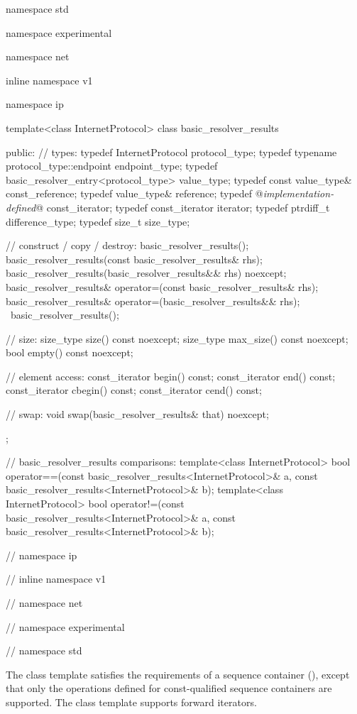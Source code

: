 \begin{codeblock}
namespace std {
namespace experimental {
namespace net {
inline namespace v1 {
namespace ip {

  template<class InternetProtocol>
  class basic_resolver_results
  {
  public:
    // types:
    typedef InternetProtocol protocol_type;
    typedef typename protocol_type::endpoint endpoint_type;
    typedef basic_resolver_entry<protocol_type> value_type;
    typedef const value_type& const_reference;
    typedef value_type& reference;
    typedef @\textit{implementation-defined}@ const_iterator;
    typedef const_iterator iterator;
    typedef ptrdiff_t difference_type;
    typedef size_t size_type;

    // construct / copy / destroy:
    basic_resolver_results();
    basic_resolver_results(const basic_resolver_results& rhs);
    basic_resolver_results(basic_resolver_results&& rhs) noexcept;
    basic_resolver_results& operator=(const basic_resolver_results& rhs);
    basic_resolver_results& operator=(basic_resolver_results&& rhs);
    ~basic_resolver_results();

    // size:
    size_type size() const noexcept;
    size_type max_size() const noexcept;
    bool empty() const noexcept;

    // element access:
    const_iterator begin() const;
    const_iterator end() const;
    const_iterator cbegin() const;
    const_iterator cend() const;

    // swap:
    void swap(basic_resolver_results& that) noexcept;
  };

  // basic_resolver_results comparisons:
  template<class InternetProtocol>
    bool operator==(const basic_resolver_results<InternetProtocol>& a,
                    const basic_resolver_results<InternetProtocol>& b);
  template<class InternetProtocol>
    bool operator!=(const basic_resolver_results<InternetProtocol>& a,
                    const basic_resolver_results<InternetProtocol>& b);

} // namespace ip
} // inline namespace v1
} // namespace net
} // namespace experimental
} // namespace std
\end{codeblock}

\pnum
The class template  satisfies the requirements of a sequence container (), except that only the operations defined for const-qualified sequence containers are supported. The class template  supports forward iterators.

